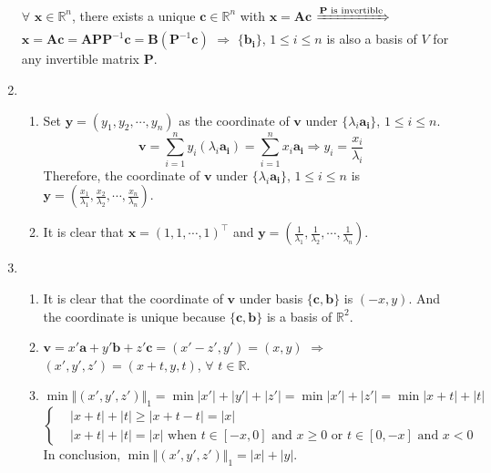 \documentclass[11pt,letter,notitlepage]{article}
\theoremstyle{definition}
\begin{document}
\begin{solution}
\begin{enumerate}
			$\forall$ $\mathbf{x} \in \mathbb{R}^n$, there exists a unique $\mathbf{c} \in \mathbb{R}^n$ with $\mathbf{x} = \mathbf{A}\mathbf{c}$ $\xRightarrow{\mathbf{P} \text{ is invertible}}$ $\mathbf{x} = \mathbf{A}\mathbf{c} = \mathbf{A} \mathbf{P} \mathbf{P}^{-1} \mathbf{c} = \mathbf{B} \left(\mathbf{P}^{-1} \mathbf{c}\right)$ $\Longrightarrow$ $\{\mathbf{b_i}\}$, $1 \leq i \leq n$ is also a basis of $V$ for any invertible  matrix $\mathbf{P}$.
			\item 
			\begin{enumerate}
				\item 
				Set $\mathbf{y} = (y_1, y_2, \cdots, y_n)$ as the coordinate of $\mathbf{v}$ under $\{\lambda_i \mathbf{a_i}\}$, $1 \leq i \leq n$.
				\[
				\mathbf{v}
				=
				\sum\limits_{i = 1}^{n} y_i (\lambda_i \mathbf{a_i}) 
				=
				\sum\limits_{i = 1}^{n} x_i \mathbf{a_i}
				\Longrightarrow
				y_i
				=
				\frac{x_i}{\lambda_i}
				\]
				Therefore, the coordinate of $\mathbf{v}$ under $\{\lambda_i \mathbf{a_i}\}$, $1 \leq i \leq n$ is $\mathbf{y} = \left(\frac{x_1}{\lambda_1}, \frac{x_2}{\lambda_2}, \cdots, \frac{x_n}{\lambda_n}\right)$.
				\item 
				It is clear that $\mathbf{x} = (1, 1, \cdots, 1)^{\top}$ and $\mathbf{y} = \left(\frac{1}{\lambda_1}, \frac{1}{\lambda_2}, \cdots, \frac{1}{\lambda_n}\right)$.
			\end{enumerate}
			\item 
			\begin{enumerate}
				\item 
				It is clear that the coordinate of $\mathbf{v}$ under basis $\{\mathbf{c}, \mathbf{b}\}$ is $(-x, y)$. And the coordinate is unique because $\{\mathbf{c}, \mathbf{b}\}$ is a basis of $\mathbb{R}^2$.
				\item 
				$\mathbf{v} = x'\mathbf{a}+y'\mathbf{b}+z'\mathbf{c} = (x'-z', y') = (x,y)$ $\Longrightarrow$ $(x', y', z') = (x+t, y, t)$, $\forall$ $t \in \mathbb{R}$.
				\item 
				\[
				\min \Vert (x', y', z') \Vert_1
				=
				\min |x'| + |y'| + |z'|
				=
				\min |x'| + |z'|
				=
				\min |x+t| + |t|
				\]
				\begin{equation}
				\left\{
				\begin{aligned}
					\nonumber
				&|x+t| + |t| \geq |x+t-t| = |x|\\
				&|x+t| + |t| = |x| \text{ when } t\in[-x,0] \text{ and } x \geq 0 \text{ or } t\in[0,-x] \text{ and } x < 0
				\end{aligned}
				\right.
				\end{equation}
				In conclusion, $\min \Vert (x', y', z') \Vert_1 = |x| + |y|$.
			\end{enumerate}
		\end{enumerate}
	\end{solution}
\end{document}
